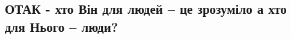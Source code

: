 
 
 
 
 

\subsection{ОТАК - хто Він для людей – це зрозуміло а хто для Нього – люди?}
\label{sec:08_04_2021.fb.makarenko_oksana.1.bog_ukraincy}


